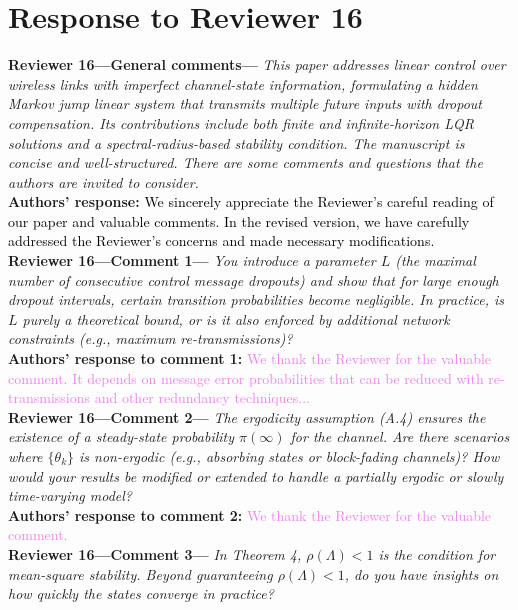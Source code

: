 \section{Response to Reviewer 16}
\begin{bibunit}
\textbf{Reviewer 16---General comments---}\textit{%
This paper addresses linear control over wireless links with imperfect channel-state information, formulating a hidden Markov jump linear system that transmits multiple future inputs with dropout compensation.
Its contributions include both finite and infinite-horizon LQR solutions and a spectral-radius-based stability condition. The manuscript is concise and well-structured. There are some comments and questions that the authors are invited to consider.}\\[2mm]
\textbf{Authors' response:} \textcolor{black}{We sincerely appreciate the Reviewer's careful reading of our paper and valuable comments. In the revised version, we have carefully addressed the Reviewer's concerns and made necessary modifications.}\\[4mm]
\textbf{Reviewer 16---Comment 1---}\textit{%
You introduce a parameter $L$ (the maximal number of consecutive control message dropouts) and show that for large enough dropout intervals, certain transition probabilities become negligible. 
In practice, is $L$ purely a theoretical bound, or is it also enforced by additional network constraints (e.g., maximum re-transmissions)?}\\[2mm]
\textbf{Authors' response to comment 1:} \textcolor{violet}{We thank the Reviewer for the valuable comment. It depends on message error probabilities that can be reduced with re-transmissions and other redundancy techniques...}\\[4mm]
\textbf{Reviewer 16---Comment 2---}\textit{%
The ergodicity assumption (A.4) ensures the existence of a steady-state probability $\pi(\infty)$ for the channel. 
Are there scenarios where $\{\theta_k\}$ is non-ergodic (e.g., absorbing states or block-fading channels)? 
How would your results be modified or extended to handle a partially ergodic or slowly time-varying model?}\\[2mm]
\textbf{Authors' response to comment 2:} \textcolor{violet}{We thank the Reviewer for the valuable comment. }\\[4mm]
\textbf{Reviewer 16---Comment 3---}\textit{%
In Theorem 4, $\rho(\Lambda) < 1$ is the condition for mean-square stability. 
Beyond guaranteeing $\rho(\Lambda) < 1$, do you have insights on how quickly the states converge in practice? 
}
\end{bibunit}
